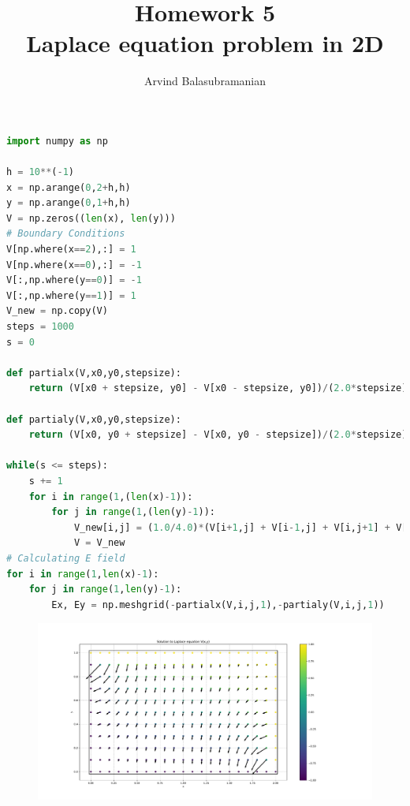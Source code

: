 \documentclass[a4paper,10pt]{article}
\title{Homework 5 \\
\textbf{Laplace equation problem in 2D}}
\author{Arvind Balasubramanian}
\date{}
\begin{document}
\maketitle
\begin{lstlisting}[language=python]
import numpy as np

h = 10**(-1)
x = np.arange(0,2+h,h)
y = np.arange(0,1+h,h)
V = np.zeros((len(x), len(y)))
# Boundary Conditions
V[np.where(x==2),:] = 1
V[np.where(x==0),:] = -1
V[:,np.where(y==0)] = -1
V[:,np.where(y==1)] = 1
V_new = np.copy(V)
steps = 1000
s = 0

def partialx(V,x0,y0,stepsize):
    return (V[x0 + stepsize, y0] - V[x0 - stepsize, y0])/(2.0*stepsize) 

def partialy(V,x0,y0,stepsize):
    return (V[x0, y0 + stepsize] - V[x0, y0 - stepsize])/(2.0*stepsize)

while(s <= steps):
    s += 1
    for i in range(1,(len(x)-1)):
        for j in range(1,(len(y)-1)):
            V_new[i,j] = (1.0/4.0)*(V[i+1,j] + V[i-1,j] + V[i,j+1] + V[i,j-1])
            V = V_new
# Calculating E field            
for i in range(1,len(x)-1):
    for j in range(1,len(y)-1):
        Ex, Ey = np.meshgrid(-partialx(V,i,j,1),-partialy(V,i,j,1))
\end{lstlisting}

\begin{figure}[H]
\centering
\includegraphics[scale=0.45]{solution} 
\end{figure}
\end{document}
